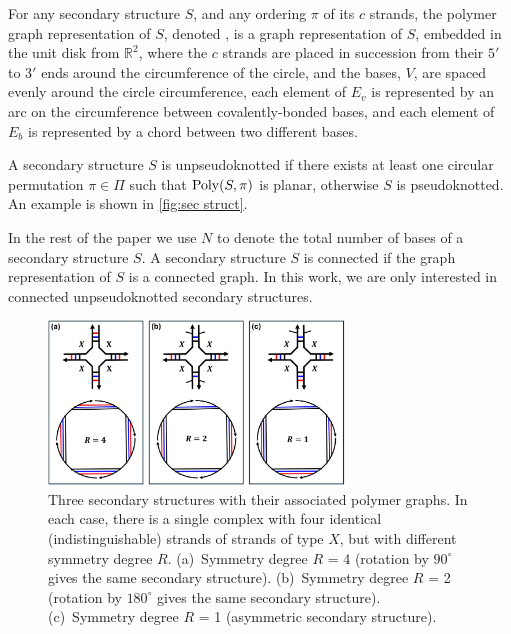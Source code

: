 \begin{Definition}
	For any secondary structure $S$, and any ordering $\pi$ of its $c$ strands, the polymer graph representation of $S$,  denoted  \PolySpi, is a graph representation of $S$, embedded in the unit disk from $\mathbb{R}^2$, where the $c$ strands are placed in succession from their $5'$ to $3'$ ends around the circumference of the circle, and the bases, $V$, are spaced evenly around the circle circumference, each element of $E_v$ is represented by an arc on the circumference between covalently-bonded bases, and each element of $E_b$ is represented by a chord between two different bases. 
\end{Definition}

\begin{Definition}
	A secondary structure $S$ is unpseudoknotted if there exists at least one circular permutation $\pi \in \Pi$ such that $\mathrm{Poly}(S,\pi)$ is planar, otherwise $S$ is pseudoknotted. 
	An example is shown in \cref{fig:sec struct}.
\end{Definition} 


\begin{remark}
	In the rest of the paper we use $N$ to denote the total number of bases of a secondary structure $S$.
	A secondary structure $S$ is connected if the graph representation of $S$ is a connected graph. In this work, we are only interested in connected unpseudoknotted secondary structures.
\end{remark}

\begin{figure}[t]
	\centering\includegraphics[width=0.7\textwidth]{figures/sym.jpg}
	
	\caption{Three secondary structures  with their associated polymer graphs. In each case, there is a single complex with four identical (indistinguishable) strands of  strands of type $X$, but with different symmetry degree $R$. 
		(a)~Symmetry degree $R$ = 4 (rotation by $90^{\circ}$  gives the same secondary structure). 
		(b)~Symmetry degree  $R$ = 2 (rotation by $180^{\circ}$  gives the same secondary structure). 
		(c)~Symmetry degree  $R$ = 1 (asymmetric secondary structure).
	}\label{fig:sym}
\end{figure}

